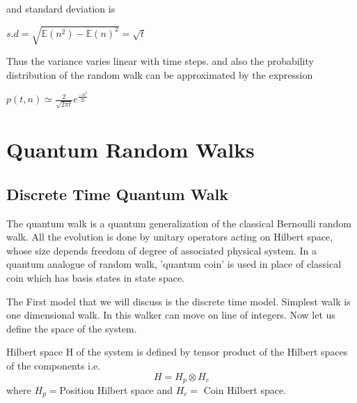 \documentclass[11 pt]{article}
\theoremstyle{definition}
\theoremstyle{remark}
\newcommand{\tens}[1]{
  \mathbin{\mathop{\otimes}\limits_{#1}}}
\begin{document}
and standard deviation is 
\begin{center}
    $s.d = \sqrt{\mathbb{E}(n^2) -{\mathbb{E}(n)}^2} = \sqrt{t}$
\end{center}
Thus the variance varies linear with time steps. and also the probability distribution of the random walk can be approximated by the expression
\begin{center}
    $ p(t,n) \simeq \frac{2}{\sqrt{2\pi t}} e^{\frac{-n^{2}}{2t}}$
\end{center}

\section{Quantum Random Walks}
\subsection{Discrete Time Quantum Walk }
The quantum walk is a quantum generalization of the classical Bernoulli random walk. All the evolution is done by unitary operators acting on Hilbert space, whose size depends freedom of degree of associated physical system. In a quantum analogue of random walk, 'quantum coin' is used in place of classical coin which has basis states in state space.

The First model that we will discuss is the discrete time model. Simplest walk is one dimensional walk. In this walker can move on line of integers.
Now let us define the space of the system.

Hilbert space H of the system is defined by tensor product of the Hilbert spaces of the components i.e. $$H = H_{p} \tens{} H_{c}$$ 
where $H_{p} = $Position Hilbert space and $H_{c} = $ Coin Hilbert space.\\
\end{document}
